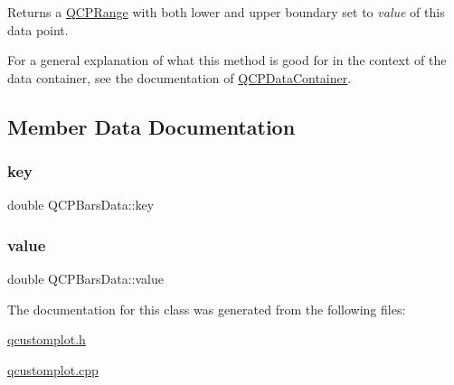 Returns a \hyperlink{class_q_c_p_range}{Q\+C\+P\+Range} with both lower and upper boundary set to {\itshape value} of this data point.

For a general explanation of what this method is good for in the context of the data container, see the documentation of \hyperlink{class_q_c_p_data_container}{Q\+C\+P\+Data\+Container}. 

\subsection{Member Data Documentation}
\mbox{\label{class_q_c_p_bars_data_a09b492217dc03ee1c0348a2f2e6e0a04}} 
\subsubsection{\texorpdfstring{key}{key}}
{\footnotesize\ttfamily double Q\+C\+P\+Bars\+Data\+::key}

\mbox{\label{class_q_c_p_bars_data_ab636644fb40630f3b1b72f44d65ec072}} 
\subsubsection{\texorpdfstring{value}{value}}
{\footnotesize\ttfamily double Q\+C\+P\+Bars\+Data\+::value}



The documentation for this class was generated from the following files\+:\begin{DoxyCompactItemize}
\item 
\hyperlink{qcustomplot_8h}{qcustomplot.\+h}\item 
\hyperlink{qcustomplot_8cpp}{qcustomplot.\+cpp}\end{DoxyCompactItemize}
